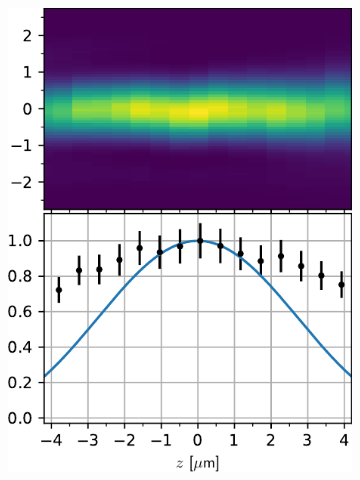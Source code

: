 \begin{figure}
\centering
	\begin{subfigure}{.49\textwidth}
	    \centering
		\includegraphics[width=\linewidth]{figures/AxialImageTweezerScanUncorrected.pdf}
		\caption{}
		\label{fig:AxialUncorrected}
	\end{subfigure}
	\begin{subfigure}{.49\textwidth}
		\centering

\end{subfigure}
\end{figure}
